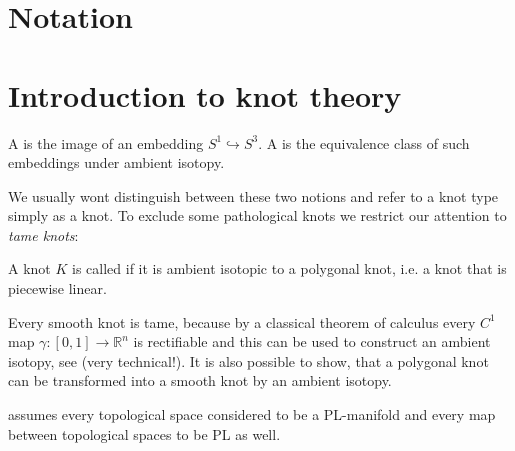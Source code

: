 
% 





\tableofcontents

\tableofcontents
\section*{Notation}

\cleardoubleoddemptypage%

\setcounter{page}{1}
\setcounter{footnote}{0}

\section{Introduction to knot theory} %
\label{sec:intro_knots}

\begin{definition}
	A  is the image of an embedding $S^1 \hookrightarrow S^3$.
	A  is the equivalence class of such embeddings under ambient isotopy.
\end{definition}

We usually wont distinguish between these two notions and refer to a knot type simply as a knot.
To exclude some pathological knots we restrict our attention to \emph{tame knots}:

\begin{definition}
	A knot $K$ is called  if it is ambient isotopic to a polygonal knot, i.e. a knot that is piecewise linear.
\end{definition}

\begin{example}
	Every smooth knot is tame, because by a classical theorem of calculus every $C^1$ map $\gamma \colon [0,1] \to \mathbb{R}^n$ is rectifiable and this can be used to construct an ambient isotopy, see \textcite[Appendix I.]{introduction-knots} (very technical!).
	It is also possible to show, that a polygonal knot can be transformed into a smooth knot by an ambient isotopy.
\end{example}

\textcite[p.~9]{morishita} assumes every topological space considered to be a PL-manifold and every map between topological spaces to be PL as well.


